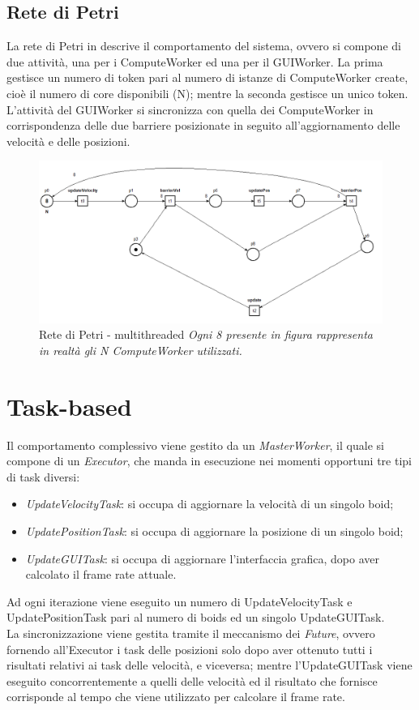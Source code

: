 \documentclass[a4paper,12pt]{report}
\begin{document}
\subsection{Rete di Petri}
\label{sec:petri-net-multithreaded}
La rete di Petri in  descrive il comportamento del sistema, ovvero si compone di due attività, una per i ComputeWorker ed una per il GUIWorker. La prima gestisce un numero di token pari al numero di istanze di ComputeWorker create, cioè il numero di core disponibili (N); mentre la seconda gestisce un unico token. L'attività del GUIWorker si sincronizza con quella dei ComputeWorker in corrispondenza delle due barriere posizionate in seguito all'aggiornamento delle velocità e delle posizioni.
\begin{figure}[H]
    \centering
    \includegraphics[width=\linewidth]{figures/multithreaded.png}
    \caption{\centering Rete di Petri - multithreaded \newline \textit{Ogni 8 presente in figura rappresenta in realtà gli N ComputeWorker utilizzati.}}
    \label{fig:petri-net-multithreaded}
\end{figure}
\section{Task-based}
Il comportamento complessivo viene gestito da un \textit{MasterWorker}, il quale si compone di un \textit{Executor}, che manda in esecuzione nei momenti opportuni tre tipi di task diversi:
\begin{itemize}
    \item \textit{UpdateVelocityTask}: si occupa di aggiornare la velocità di un singolo boid;
    \item \textit{UpdatePositionTask}: si occupa di aggiornare la posizione di un singolo boid;
    \item \textit{UpdateGUITask}: si occupa di aggiornare l'interfaccia grafica, dopo aver calcolato il frame rate attuale.
\end{itemize}
Ad ogni iterazione viene eseguito un numero di UpdateVelocityTask e UpdatePositionTask pari al numero di boids ed un singolo UpdateGUITask.\\
La sincronizzazione viene gestita tramite il meccanismo dei \textit{Future}, ovvero fornendo all'Executor i task delle posizioni solo dopo aver ottenuto tutti i risultati relativi ai task delle velocità, e viceversa; mentre l'UpdateGUITask viene eseguito concorrentemente a quelli delle velocità ed il risultato che fornisce corrisponde al tempo che viene utilizzato per calcolare il frame rate.
\end{document}
